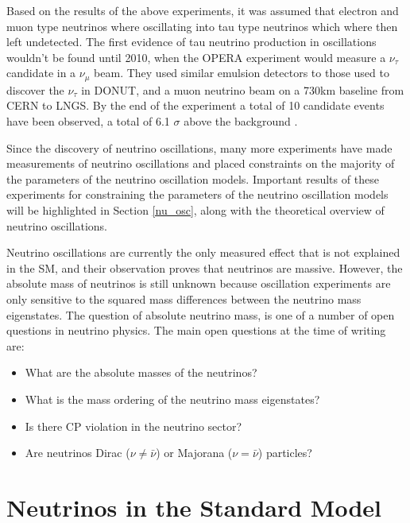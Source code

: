 Based on the results of the above experiments, it was assumed that electron and
muon type neutrinos where oscillating into tau type neutrinos which where then
left undetected. The first evidence of tau neutrino production in oscillations
wouldn't be found until 2010, when the OPERA experiment would measure
a \(\nu_\tau\) candidate in a \(\nu_\mu\) beam. They used similar emulsion 
detectors to those used to discover the \(\nu_\tau\) in DONUT, and a muon
neutrino beam on a 730km baseline from CERN to LNGS. By the end of the 
experiment a total of 10 candidate events have been observed, a total of 6.1 
\(\sigma\) above the background \cite{Agafonova2010, Agafonova2018}.

Since the discovery of neutrino oscillations, many more experiments have made
measurements of neutrino oscillations and placed constraints on the majority of
the parameters of the neutrino oscillation models. Important results of these 
experiments for constraining the parameters of the neutrino oscillation models 
will be highlighted in Section \ref{nu_osc}, along with the theoretical 
overview of neutrino oscillations.

Neutrino oscillations are currently the only measured effect that is not
explained in the SM, and their observation proves that neutrinos are massive.
However, the absolute mass of neutrinos is still unknown because oscillation
experiments are only sensitive to the squared mass differences between the
neutrino mass eigenstates. The question of absolute neutrino mass, is one of a
number of open questions in neutrino physics. The main open questions at the
time of writing are:
\begin{itemize}
	\item What are the absolute masses of the neutrinos?
	\item What is the mass ordering of the neutrino mass eigenstates?
	\item Is there CP violation in the neutrino sector?
	\item Are neutrinos Dirac ($\nu \ne \bar{\nu}$) or Majorana 
		($\nu = \bar{\nu}$) particles?
\end{itemize}

\section{Neutrinos in the Standard Model} \label{nu_sm}

